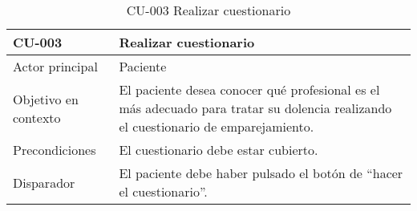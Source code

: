 \begin{table}[htpb]
\centering
\caption{CU-003 Realizar cuestionario}
\begin{tabularx}{\textwidth}{|X|X|}
\hline
CU-003                            & Realizar cuestionario                                                                                                                                                                                                                                                                                                                                                                                                                                                                                                    \\ \hline
Actor principal                   & Paciente                                                                                                                                                                                                                                                                                                                                                                                                                                                                                                                 \\ \hline
Objetivo en contexto              & El paciente desea conocer qué profesional es el más adecuado para tratar su dolencia realizando el cuestionario de emparejamiento.                                                                                                                                                                                                                                                                                                                                                                                       \\ \hline
Precondiciones                    & El cuestionario debe estar cubierto.                                                                                                                                                                                                                                                                                                                                                                                                                                                                                     \\ \hline
Disparador                        & El paciente debe haber pulsado el botón de “hacer el cuestionario”.                                                                                                                                                                                                                                                                                                                                                                                                                                                      \\ \hline

\end{tabularx}
\end{table}
